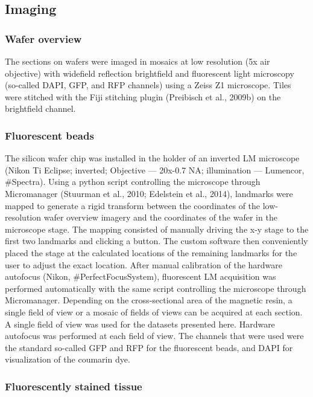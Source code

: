 \documentclass{article}
\begin{document}
\subsection*{Imaging}

\subsubsection*{Wafer overview}

The sections on wafers were imaged in mosaics at low resolution (5x air objective) with widefield reflection brightfield and fluorescent light microscopy (so-called DAPI, GFP, and RFP channels) using a Zeiss Z1 microscope. Tiles were stitched with the Fiji stitching plugin (Preibisch et al., 2009b) on the brightfield channel.

\subsubsection*{Fluorescent beads}

The silicon wafer chip was installed in the holder of an inverted LM microscope (Nikon Ti Eclipse; inverted; Objective — 20x-0.7 NA; illumination — Lumencor, \#Spectra). Using a python script controlling the microscope through Micromanager (Stuurman et al., 2010; Edelstein et al., 2014), landmarks were mapped to generate a rigid transform between the coordinates of the low-resolution wafer overview imagery and the coordinates of the wafer in the microscope stage. The mapping consisted of manually driving the x-y stage to the first two landmarks and clicking a button. The custom software then conveniently placed the stage at the calculated locations of the remaining landmarks for the user to adjust the exact location. After manual calibration of the hardware autofocus (Nikon, \#PerfectFocusSystem), fluorescent LM acquisition was performed automatically with the same script controlling the microscope through Micromanager. Depending on the cross-sectional area of the magnetic resin, a single field of view or a mosaic of fields of views can be acquired at each section. A single field of view was used for the datasets presented here. Hardware autofocus was performed at each field of view. The channels that were used were the standard so-called GFP and RFP for the fluorescent beads, and DAPI for visualization of the coumarin dye.

\subsubsection*{Fluorescently stained tissue}
\end{document}
